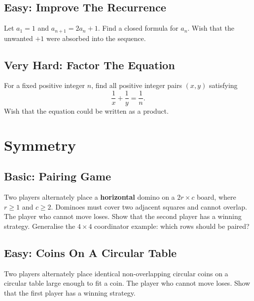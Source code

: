 \documentclass[12pt]{article}
\begin{document}
\subsection*{Easy: Improve The Recurrence}
Let $a_1=1$ and $a_{n+1}=2a_n+1$. Find a closed formula for $a_n$.
Wish that the unwanted $+1$ were absorbed into the sequence.

\subsection*{Very Hard: Factor The Equation}
For a fixed positive integer $n$, find all positive integer pairs
$(x,y)$ satisfying
\[
\frac1x+\frac1y=\frac1n.
\]
Wish that the equation could be written as a product.

\section{Symmetry}

\subsection*{Basic: Pairing Game}
Two players alternately place a \textbf{horizontal} domino on a
$2r\times c$ board, where $r\ge1$ and $c\ge2$. Dominoes must cover two
adjacent squares and cannot overlap. The player who cannot move loses.
Show that the second player has a winning strategy. Generalise the
$4\times4$ coordinator example: which rows should be paired?

\begin{center}
\end{center}

\subsection*{Easy: Coins On A Circular Table}
Two players alternately place identical non-overlapping circular coins
on a circular table large enough to fit a coin. The player who cannot
move loses. Show that the first player has a winning strategy.
\end{document}
